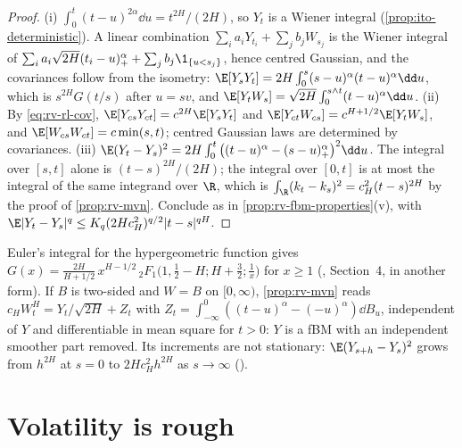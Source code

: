 \begin{proof}
(i) $\int_0^t(t-u)^{2\alpha}\dd u=t^{2H}/(2H)$, so $Y_t$ is a Wiener integral (\cref{prop:ito-deterministic}). A
linear combination $\sum_ia_iY_{t_i}+\sum_jb_jW_{s_j}$ is the Wiener integral of
$\sum_ia_i\sqrt{2H}(t_i-u)_+^\alpha+\sum_jb_j\1_{\{u<s_j\}}$, hence centred Gaussian, and the covariances follow
from the isometry: $\E[Y_sY_t]=2H\int_0^s(s-u)^\alpha(t-u)^\alpha\dd u$, which is $s^{2H}G(t/s)$ after $u=sv$, and
$\E[Y_tW_s]=\sqrt{2H}\int_0^{s\wedge t}(t-u)^\alpha\dd u$.
(ii) By \eqref{eq:rv-rl-cov}, $\E[Y_{cs}Y_{ct}]=c^{2H}\E[Y_sY_t]$ and $\E[Y_{ct}W_{cs}]=c^{H+1/2}\E[Y_tW_s]$, and
$\E[W_{cs}W_{ct}]=c\min(s,t)$; centred Gaussian laws are determined by covariances.
(iii) $\E(Y_t-Y_s)^2=2H\int_0^t\big((t-u)^\alpha-(s-u)_+^\alpha\big)^2\dd u$. The integral over $[s,t]$ alone is
$(t-s)^{2H}/(2H)$; the integral over $[0,t]$ is at most the integral of the same integrand over $\R$, which is
$\int_\R(k_t-k_s)^2=c_H^2(t-s)^{2H}$ by the proof of \cref{prop:rv-mvn}. Conclude as in \cref{prop:rv-fbm-properties}(v),
with $\E|Y_t-Y_s|^q\le K_q(2Hc_H^2)^{q/2}|t-s|^{qH}$.
\end{proof}

Euler's integral for the hypergeometric function gives
$G(x)=\frac{2H}{H+1/2}\,x^{H-1/2}\,{}_2F_1\big(1,\tfrac12-H;H+\tfrac32;\tfrac1x\big)$ for $x\ge1$
(\textcite{bayer-friz-gatheral-2016}, Section~4, in another form). If $B$ is two-sided and $W=B$ on
$[0,\infty)$, \cref{prop:rv-mvn} reads $c_HW^H_t=Y_t/\sqrt{2H}+Z_t$ with $Z_t=\int_{-\infty}^0((t-u)^\alpha-(-u)^\alpha)\dd B_u$,
independent of $Y$ and differentiable in mean square for $t>0$: $Y$ is a fBM with an independent smoother part
removed. Its increments
are not stationary: $\E(Y_{s+h}-Y_s)^2$ grows from $h^{2H}$ at $s=0$ to $2Hc_H^2h^{2H}$ as $s\to\infty$
().

\section{Volatility is rough}\label{sec:rv-gjr}

